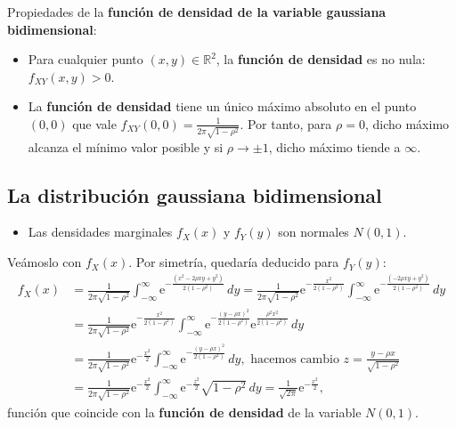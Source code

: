 \documentclass[]{book}
\providecommand{\tightlist}{%
  \setlength{\itemsep}{0pt}\setlength{\parskip}{0pt}}
\begin{document}
Propiedades de la \textbf{función de densidad de la variable gaussiana bidimensional}:

\begin{itemize}
\item
  Para cualquier punto \((x,y)\in\mathbb{R}^2\), la \textbf{función de densidad} es no nula: \(f_{XY}(x,y)>0\).
\item
  La \textbf{función de densidad} tiene un único máximo absoluto en el punto \((0,0)\) que vale \(f_{XY}(0,0)=\frac{1}{2\pi\sqrt{1-\rho^2}}.\) Por tanto, para \(\rho=0\), dicho máximo alcanza el mínimo valor posible y si \(\rho\to \pm 1\), dicho máximo tiende a \(\infty\).
\end{itemize}

\hypertarget{la-distribuciuxf3n-gaussiana-bidimensional-2}{%
\subsection{La distribución gaussiana bidimensional}\label{la-distribuciuxf3n-gaussiana-bidimensional-2}}

\begin{itemize}
\tightlist
\item
  Las densidades marginales \(f_X(x)\) y \(f_Y(y)\) son normales \(N(0,1)\).
\end{itemize}

Veámoslo con \(f_X(x)\). Por simetría, quedaría deducido para \(f_Y(y)\):
\[
\begin{array}{rl}
f_X(x) & =\frac{1}{2\pi\sqrt{1-\rho^2}}\int_{-\infty}^\infty \mathrm{e}^{-\frac{(x^2-2\rho xy+y^2)}{2(1-\rho^2)}}\, dy =
\frac{1}{2\pi\sqrt{1-\rho^2}}\mathrm{e}^{-\frac{x^2}{2(1-\rho^2)}}\int_{-\infty}^\infty \mathrm{e}^{-\frac{(-2\rho xy+y^2)}{2(1-\rho^2)}}\, dy \\ & = \frac{1}{2\pi\sqrt{1-\rho^2}}\mathrm{e}^{-\frac{x^2}{2(1-\rho^2)}} \int_{-\infty}^\infty \mathrm{e}^{-\frac{(y-\rho x)^2}{2(1-\rho^2)}} \mathrm{e}^{\frac{\rho^2 x^2}{2(1-\rho^2)}}\, dy \\ & =\frac{1}{2\pi\sqrt{1-\rho^2}}\mathrm{e}^{-\frac{x^2}{2}} \int_{-\infty}^\infty \mathrm{e}^{-\frac{(y-\rho x)^2}{2(1-\rho^2)}}\, dy,  \mbox{ hacemos cambio $z=\frac{y-\rho x}{\sqrt{1-\rho^2}}$}\\ & = \frac{1}{2\pi\sqrt{1-\rho^2}}\mathrm{e}^{-\frac{x^2}{2}} \int_{-\infty}^\infty \mathrm{e}^{-\frac{z^2}{2}}\sqrt{1-\rho^2}\, dy =\frac{1}{\sqrt{2\pi}}\mathrm{e}^{-\frac{x^2}{2}},
\end{array}
\]
función que coincide con la \textbf{función de densidad} de la variable \(N(0,1)\).
\end{document}

